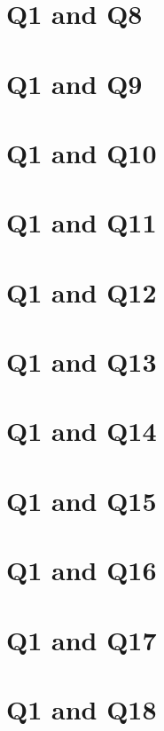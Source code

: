 \documentclass{report}
\begin{document}
\clearpage
\section{Q1 and Q8}


\clearpage
\section{Q1 and Q9}


\clearpage
\section{Q1 and Q10}


\clearpage
\section{Q1 and Q11}


\clearpage
\section{Q1 and Q12}


\clearpage
\section{Q1 and Q13}


\clearpage
\section{Q1 and Q14}


\clearpage
\section{Q1 and Q15}


\clearpage
\section{Q1 and Q16}


\clearpage
\section{Q1 and Q17}


\clearpage
\section{Q1 and Q18}

\end{document}
